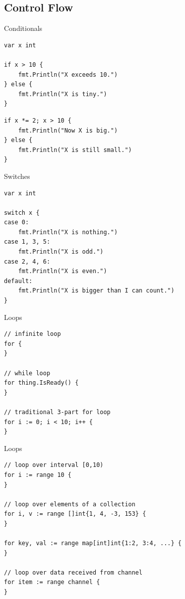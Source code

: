 \documentclass[pdf,t]{beamer}
\begin{document}
\subsection{Control Flow}
\begin{frame}[fragile]{Conditionals}
\begin{lstlisting}
var x int

if x > 10 {
    fmt.Println("X exceeds 10.")
} else {
    fmt.Println("X is tiny.")
}
\end{lstlisting}
\pause
\begin{lstlisting}
if x *= 2; x > 10 {
    fmt.Println("Now X is big.")
} else {
    fmt.Println("X is still small.")
}
\end{lstlisting}
\end{frame}
\begin{frame}[fragile]{Switches}
\begin{lstlisting}
var x int

switch x {
case 0:
    fmt.Println("X is nothing.")
case 1, 3, 5:
    fmt.Println("X is odd.")
case 2, 4, 6:
    fmt.Println("X is even.")
default:
    fmt.Println("X is bigger than I can count.")
}
\end{lstlisting}
\end{frame}
\begin{frame}[fragile]{Loops}
\begin{lstlisting}
// infinite loop
for {
}

// while loop
for thing.IsReady() {
}

// traditional 3-part for loop
for i := 0; i < 10; i++ {
}
\end{lstlisting}
\end{frame}

\begin{frame}[fragile]{Loops}
\begin{lstlisting}
// loop over interval [0,10)
for i := range 10 {
}

// loop over elements of a collection
for i, v := range []int{1, 4, -3, 153} {
}

for key, val := range map[int]int{1:2, 3:4, ...} {
}

// loop over data received from channel
for item := range channel {
}
\end{lstlisting}
\end{frame}
\end{document}
